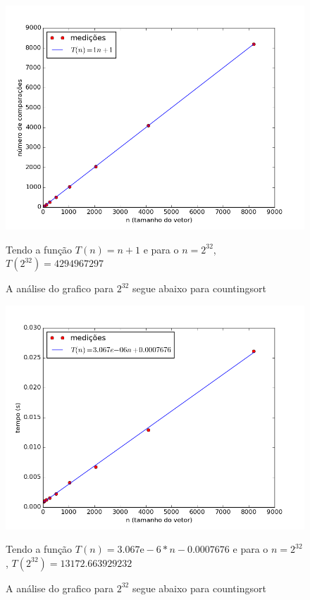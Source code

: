 \documentclass[12pt,a4paper,twoside]{report}
\begin{document}
\begin{figure}[ht]
\centering \includegraphics[scale=0.8]{../countingsort/imagens/countingsortQuaseDecresc301.png}
\caption{A análise do grafico para $2^{32}$ segue abaixo para countingsort}

Tendo a função $T(n) = n+1$ e para o $n =2^{32}$, $T(2^{32}) = 4294967297$ 
\label{fig:countingsortQuaseDecresc301}
\end{figure}




\begin{figure}[ht]
\centering \includegraphics[scale=0.8]{../countingsort/imagens/countingsortQuaseDecresc400.png}
\caption{A análise do grafico para $2^{32}$ segue abaixo para countingsort}

Tendo a função $T(n) = 3.067\mathrm{e}-6*n-0.0007676$ e para o $n =2^{32}$, $T(2^{32}) = 13172.663929232$ 
\label{fig:countingsortQuaseDecresc400}
\end{figure}
\end{document}
